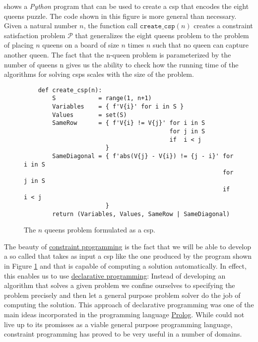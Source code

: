  shows a \textsl{Python} program that can be used to create a \ac{csp} that
encodes the eight queens puzzle.  The code shown in this figure is more general than necessary.  Given a natural
number $n$, the function call $\texttt{create\_csp}(n)$ creates a constraint satisfaction problem $\mathcal{P}$ that generalizes
the eight queens problem to the problem of placing $n$ queens on a board of size $n$ times $n$ such that no
queen can capture another queen.  The fact that the n-queen problem is parameterized by the number of queens n
gives us the ability to check how the running time of the algorithms for solving \ac{csp}s scales with the size
of the problem. 


\begin{figure}[!ht]
\centering
\begin{verbatim}    
    def create_csp(n):
        S            = range(1, n+1)           
        Variables    = { f'V{i}' for i in S }
        Values       = set(S)
        SameRow      = { f'V{i} != V{j}' for i in S
                                         for j in S
                                         if  i < j 
                       }
        SameDiagonal = { f'abs(V{j} - V{i}) != {j - i}' for i in S
                                                        for j in S 
                                                        if  i < j 
                       }
        return (Variables, Values, SameRow | SameDiagonal)
\end{verbatim}
\vspace*{-0.3cm}
\caption{The $n$ queens problem formulated as a \ac{csp}.}
\label{fig:N-Queens-Problem-CSP.ipynb}
\end{figure}


The beauty of \href{https://en.wikipedia.org/wiki/Constraint_programming}{constraint programming} is the fact
that we will be able to develop a so called  that takes as input a \ac{csp}
like the one produced by the program shown in Figure \ref{fig:N-Queens-Problem-CSP.ipynb} and that is capable of
computing a solution automatically.  In effect, this enables us to use
\href{https://en.wikipedia.org/wiki/Declarative_programming}{declarative programming}:  Instead of developing
an algorithm that solves a given problem we confine ourselves to  specifying the problem precisely and then let a
general purpose problem solver do the job of computing the solution.  This approach of declarative programming 
was one of the main ideas incorporated in the programming language
\href{https://en.wikipedia.org/wiki/Prolog}{Prolog}.  While  could not live up to its promisses
as a viable general purpose programming language, constraint programming has proved to be very useful in a
number of domains.  


